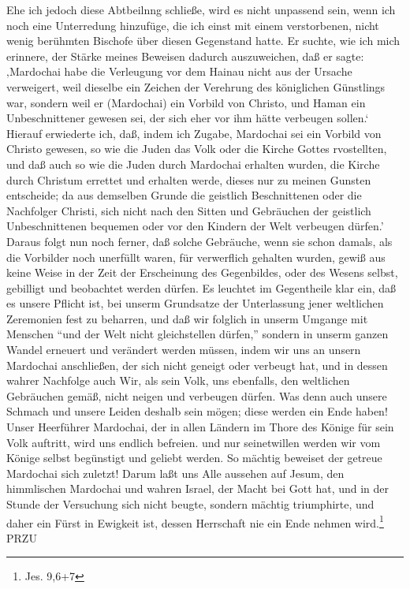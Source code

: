 Ehe ich jedoch diese Abtbeilnng schließe, wird es nicht unpassend sein, wenn ich
noch eine Unterredung hinzufüge, die ich einst mit einem verstorbenen, nicht
wenig berühmten Bischofe über diesen Gegenstand hatte. Er suchte, wie ich mich
erinnere, der Stärke meines Beweisen dadurch auszuweichen, daß er sagte:
‚Mardochai habe die Verleugung vor dem Hainau nicht aus der Ursache verweigert,
weil dieselbe ein Zeichen der Verehrung des königlichen Günstlings war, sondern
weil er (Mardochai) ein Vorbild von Christo, und Haman ein Unbeschnittener
gewesen sei, der sich eher vor ihm hätte verbeugen sollen.‘ Hierauf erwiederte
ich, daß, indem ich Zugabe, Mardochai sei ein Vorbild von Christo gewesen, so
wie die Juden das Volk oder die Kirche Gottes rvostellten, und daß auch so wie
die Juden durch Mardochai erhalten wurden, die Kirche durch Christum errettet
und erhalten werde, dieses nur zu meinen Gunsten entscheide; da aus demselben
Grunde die geistlich Beschnittenen oder die Nachfolger Christi, sich nicht nach
den Sitten und Gebräuchen der geistlich Unbeschnittenen bequemen oder vor den
Kindern der Welt verbeugen dürfen.' Daraus folgt nun noch ferner, daß solche
Gebräuche, wenn sie schon damals, als die Vorbilder noch unerfüllt waren, für
verwerflich gehalten wurden, gewiß aus keine Weise in der Zeit der Erscheinung
des Gegenbildes, oder des Wesens selbst, gebilligt und beobachtet werden dürfen.
Es leuchtet im Gegentheile klar ein, daß es unsere Pflicht ist, bei unserm
Grundsatze der Unterlassung jener weltlichen Zeremonien fest zu beharren, und
daß wir folglich in unserm Umgange mit Menschen "`und der Welt nicht
gleichstellen dürfen,"' sondern in unserm ganzen Wandel erneuert und verändert
werden müssen, indem wir uns an unsern Mardochai anschließen, der sich nicht
geneigt oder verbeugt hat, und in dessen wahrer Nachfolge auch Wir, als sein
Volk, uns ebenfalls, den weltlichen Gebräuchen gemäß, nicht neigen und verbeugen
dürfen. Was denn auch unsere Schmach und unsere Leiden deshalb sein mögen; diese
werden ein Ende haben! Unser Heerführer Mardochai, der in allen Ländern im Thore
des Könige für sein Volk auftritt, wird uns endlich befreien. und nur
seinetwillen werden wir vom Könige selbst begünstigt und geliebt werden. So
mächtig beweiset der getreue Mardochai sich zuletzt! Darum laßt uns Alle
aussehen auf Jesum, den himmlischen Mardochai und wahren Israel, der Macht bei
Gott hat, und in der Stunde der Versuchung sich nicht beugte, sondern mächtig
triumphirte, und daher ein Fürst in Ewigkeit ist, dessen Herrschaft nie ein Ende
nehmen wird.\footnote{Jes. 9,6+7} {{PRZU}}

